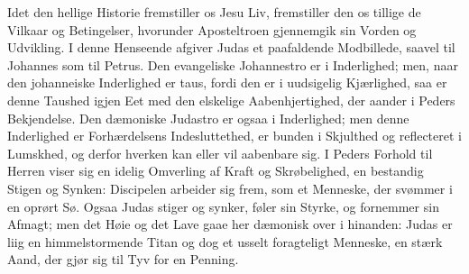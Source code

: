 \documentclass[12pt,a4paper]{book}
\begin{document}
Idet den hellige Historie fremstiller os Jesu Liv, fremstiller den os tillige de Vilkaar og
Betingelser, hvorunder Aposteltroen gjennemgik sin Vorden og Udvikling. I denne Henseende
afgiver Judas et paafaldende Modbillede, saavel til Johannes som til Petrus. Den evangeliske
Johannestro er i Inderlighed; men, naar den johanneiske Inderlighed er taus, fordi den er i
uudsigelig Kjærlighed, saa er denne Taushed igjen Eet med den elskelige Aabenhjertighed, der
aander i Peders Bekjendelse. Den dæmoniske Judastro er ogsaa i Inderlighed; men denne
Inderlighed er Forhærdelsens Indesluttethed, er bunden i Skjulthed og reflecteret i Lumskhed,
og derfor hverken kan eller vil aabenbare sig. I Peders Forhold til Herren viser sig en
idelig Omverling af Kraft og Skrøbelighed, en bestandig Stigen og Synken: Discipelen arbeider
sig frem, som et Menneske, der svømmer i en oprørt Sø. Ogsaa Judas stiger og synker, føler
sin Styrke, og fornemmer sin
Afmagt; men det Høie og det Lave gaae her dæmonisk over i hinanden: Judas er liig en
himmelstormende Titan og dog et usselt foragteligt Menneske, en stærk Aand, der gjør sig til
Tyv for en Penning.
\end{document}
